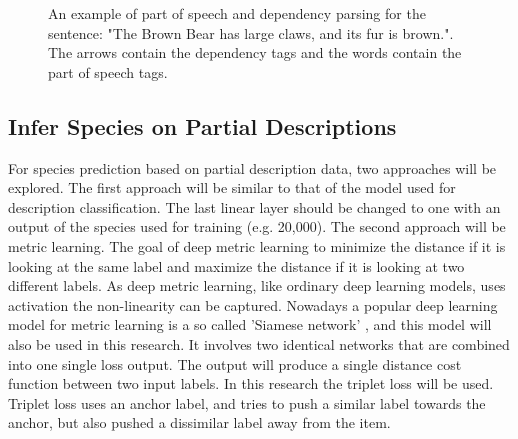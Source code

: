 \documentclass{article}
\begin{document}
\begin{figure} [t]
    \centering
    \vspace{-2.0cm}
    \makebox[\textwidth][c]{}
    \caption{An example of part of speech and dependency parsing for the sentence: "The Brown Bear has large claws, and its fur is brown.". The arrows contain the dependency tags and the words contain the part of speech tags.}
    \label{fig:PoS_example}
\end{figure}

\subsection{Infer Species on Partial Descriptions}
For species prediction based on partial description data, two approaches will be explored.
The first approach will be similar to that of the model used for description classification.
The last linear layer should be changed to one with an output of the species used for training (e.g. 20,000).
The second approach will be metric learning.
The goal of deep metric learning to minimize the distance if it is looking at the same label and maximize the distance if it is looking at two different labels.
As deep metric learning, like ordinary deep learning models, uses activation the non-linearity can be captured.
Nowadays a popular deep learning model for metric learning is a so called 'Siamese network' \autocite{kaya_deep_2019}, and this model will also be used in this research.
It involves two identical networks that are combined into one single loss output.
The output will produce a single distance cost function between two input labels.
In this research the triplet loss \autocite{schroff_facenet_2015} will be used.
Triplet loss uses an anchor label, and tries to push a similar label towards the anchor, but also pushed a dissimilar label away from the item.
\end{document}
